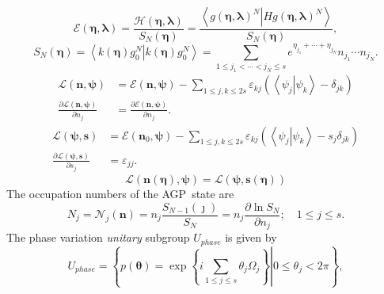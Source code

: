 \documentclass[aps,preprint]{revtex4}%
\begin{document}
\begin{equation}
\mathcal{E}\left(  \mathbf{\eta},\mathbf{\lambda}\right)  =\frac
{\mathcal{H}\left(  \mathbf{\eta},\mathbf{\lambda}\right)  }{S_{N}\left(
\mathbf{\eta}\right)  }=\frac{\left\langle \left.  g\left(  \mathbf{\eta
},\mathbf{\lambda}\right)  ^{N}\right\vert Hg\left(  \mathbf{\eta
},\mathbf{\lambda}\right)  ^{N}\right\rangle }{S_{N}\left(  \mathbf{\eta
}\right)  },\label{gp_funct}%
\end{equation}%
\begin{equation}
S_{N}\left(  \mathbf{\eta}\right)  =\left\langle \left.  k\left(
\mathbf{\eta}\right)  g_{0}^{N}\right\vert k\left(  \mathbf{\eta}\right)
g_{0}^{N}\right\rangle =\sum_{1\leq j_{1}<\cdots<j_{N}\leq s}e^{\eta_{j_{1}%
}+\cdots+\eta_{j_{N}}}n_{j_{1}}\cdots n_{j_{N}}.
\end{equation}%
\begin{align}
\mathcal{L}\left(  \mathbf{n,\psi}\right)   &  =\mathcal{E}\left(
\mathbf{n,\psi}\right)  -\sum_{1\leq j,k\leq2s}\varepsilon_{kj}\left(
\left\langle \left.  \psi_{j}\right\vert \psi_{k}\right\rangle -\delta
_{jk}\right)  \label{larE}\\
\frac{\partial\mathcal{L}\left(  \mathbf{n,\psi}\right)  }{\partial n_{j}} &
=\frac{\partial\mathcal{E}\left(  \mathbf{n,\psi}\right)  }{\partial n_{j}}.
\end{align}%
\begin{align}
\mathcal{L}\left(  \mathbf{\psi,s}\right)   &  =\mathcal{E}\left(
\mathbf{n}_{0}\mathbf{,\psi}\right)  -\sum_{1\leq j,k\leq2s}\varepsilon
_{kj}\left(  \left\langle \left.  \psi_{j}\right\vert \psi_{k}\right\rangle
-s_{j}\delta_{jk}\right)  \\
\frac{\partial\mathcal{L}\left(  \mathbf{\psi,s}\right)  }{\partial s_{j}} &
=\varepsilon_{jj}.
\end{align}%
\begin{equation}
\mathcal{L}\left(  \mathbf{n\left(  \mathbf{\eta}\right)  ,\psi}\right)
=\mathcal{L}\left(  \mathbf{\psi,s}\left(  \mathbf{\eta}\right)  \right)
\end{equation}
The occupation numbers of the AGP\ state are
\begin{equation}
N_{j}=\mathcal{N}_{j}\left(  \mathbf{n}\right)  =n_{j}\frac{S_{N-1}\left(
\jmath\right)  }{S_{N}}=n_{j}\frac{\partial\ln S_{N}}{\partial n_{j}}%
;\quad1\leq j\leq s.
\end{equation}
The phase variation \emph{unitary} subgroup $U_{phase}$ is given by%
\begin{equation}
U_{phase}=\left\{  \left.  p\left(  \bm{\theta}\right)  =\exp\left\{
i\sum_{1\leq j\leq s}\theta_{j}\Omega_{j}\right\}  \right\vert 0\leq\theta
_{j}<2\pi\right\}  ,\label{phase}%
\end{equation}
\end{document}
